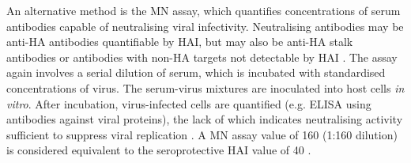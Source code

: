 An alternative method is the \gls{MN} assay, which quantifies concentrations of serum antibodies capable of neutralising viral infectivity.
Neutralising antibodies may be anti-\gls{HA} antibodies quantifiable by \gls{HAI}, but may also be anti-\gls{HA} stalk antibodies or antibodies with non-\gls{HA} targets not detectable by \gls{HAI} \autocite{krammer2019HumanAntibodyResponse}.
The assay again involves a serial dilution of serum, which is incubated with standardised concentrations of virus. 
The serum-virus mixtures are inoculated into host cells \textit{in vitro}.
After incubation, virus-infected cells are quantified (e.g. \gls{ELISA} using antibodies against viral proteins), the lack of which indicates neutralising activity sufficient to suppress viral replication \autocite{klimov2012InfluenzaVirusTitration}.
A \gls{MN} assay value of 160 (1:160 dilution) is considered equivalent to the seroprotective \gls{HAI} value of 40 \autocite{bresee2018InactivatedInfluenzaVaccines}.

